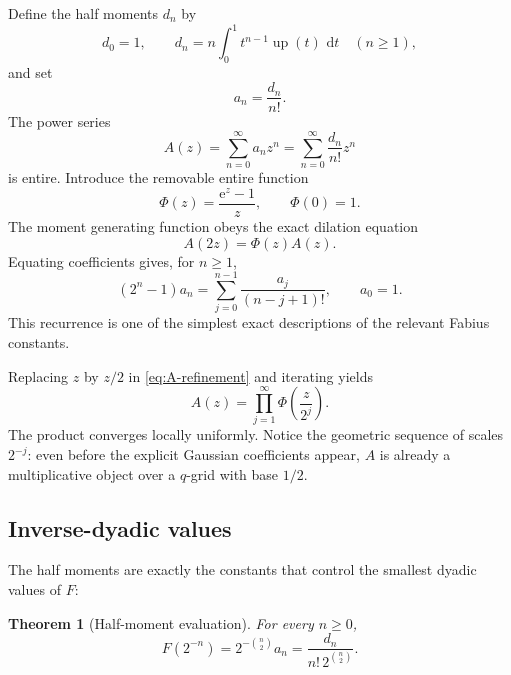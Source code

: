 \documentclass[11pt]{article}
\newtheorem{theorem}{Theorem}[section]
\theoremstyle{definition}
\newcommand{\Fabius}{F}
\newcommand{\Up}{\operatorname{up}}
\newcommand{\e}{\mathrm{e}}
\newcommand{\dd}{\,\mathrm{d}}
\begin{document}
Define the half moments $d_n$ by
\begin{equation}
  d_0=1,
  \qquad
  d_n=n\int_0^1 t^{n-1}\Up(t)\,\dd t\quad(n\ge1),
  \label{eq:half-moment-definition}
\end{equation}
and set
\begin{equation}
  a_n=\frac{d_n}{n!}.
  \label{eq:a-definition}
\end{equation}
The power series
\begin{equation}
  A(z)=\sum_{n=0}^{\infty}a_nz^n
      =\sum_{n=0}^{\infty}\frac{d_n}{n!}z^n
  \label{eq:A-definition}
\end{equation}
is entire.  Introduce the removable entire function
\begin{equation}
  \Phi(z)=\frac{\e^z-1}{z},
  \qquad \Phi(0)=1.
  \label{eq:Phi-definition}
\end{equation}
The moment generating function obeys the exact dilation equation
\begin{equation}
  A(2z)=\Phi(z)A(z).
  \label{eq:A-refinement}
\end{equation}
Equating coefficients gives, for $n\ge1$,
\begin{equation}
  (2^n-1)a_n
  =\sum_{j=0}^{n-1}\frac{a_j}{(n-j+1)!},
  \qquad
  a_0=1.
  \label{eq:a-recurrence}
\end{equation}
This recurrence is one of the simplest exact descriptions of the relevant Fabius constants.

Replacing $z$ by $z/2$ in \cref{eq:A-refinement} and iterating yields
\begin{equation}
  A(z)=\prod_{j=1}^{\infty}\Phi\!\left(\frac{z}{2^j}\right).
  \label{eq:A-infinite-product}
\end{equation}
The product converges locally uniformly.  Notice the geometric sequence of scales $2^{-j}$: even before the explicit Gaussian coefficients appear, $A$ is already a multiplicative object over a $q$-grid with base $1/2$.

\subsection{Inverse-dyadic values}

The half moments are exactly the constants that control the smallest dyadic values of $\Fabius$:
\begin{theorem}[Half-moment evaluation]
For every $n\ge0$,
\begin{equation}
  \Fabius(2^{-n})
  =2^{-\binom{n}{2}}a_n
  =\frac{d_n}{n!\,2^{\binom{n}{2}}}.
  \label{eq:fabius-half-moment}
\end{equation}
\end{theorem}
\end{document}
